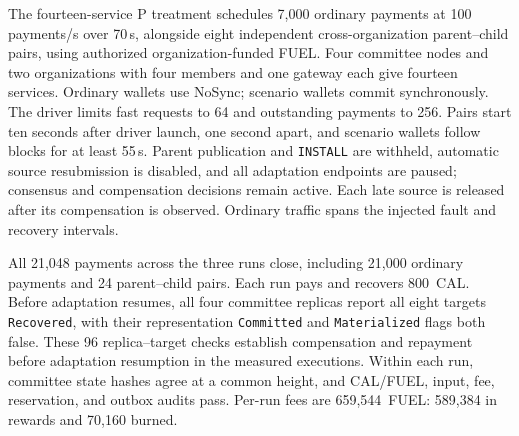 The fourteen-service P treatment schedules 7,000 ordinary payments
at 100 payments/s over 70\,s, alongside eight independent
cross-organization parent--child pairs, using authorized
organization-funded FUEL. Four committee nodes and two organizations with four members and one gateway each give fourteen services. Ordinary wallets use NoSync; scenario wallets commit synchronously. The driver limits fast requests to 64 and outstanding payments to 256. Pairs start ten seconds after driver launch, one second apart, and scenario wallets follow blocks for at least 55\,s. Parent publication and \texttt{INSTALL}
are withheld, automatic source resubmission is disabled, and all
adaptation endpoints are paused; consensus and compensation
decisions remain active. Each late source is released after its
compensation is observed. Ordinary traffic spans the injected
fault and recovery intervals.

All 21,048 payments across the three runs close, including
21,000 ordinary payments and 24 parent--child pairs. Each run
pays and recovers 800~CAL. Before adaptation resumes, all four
committee replicas report all eight targets \texttt{Recovered},
with their representation \texttt{Committed} and
\texttt{Materialized} flags both false. These 96 replica--target
checks establish compensation and repayment before adaptation
resumption in the measured executions. Within each run,
committee state hashes agree at a common height, and CAL/FUEL,
input, fee, reservation, and outbox audits pass. Per-run fees are
659,544~FUEL: 589,384 in rewards and 70,160 burned.


